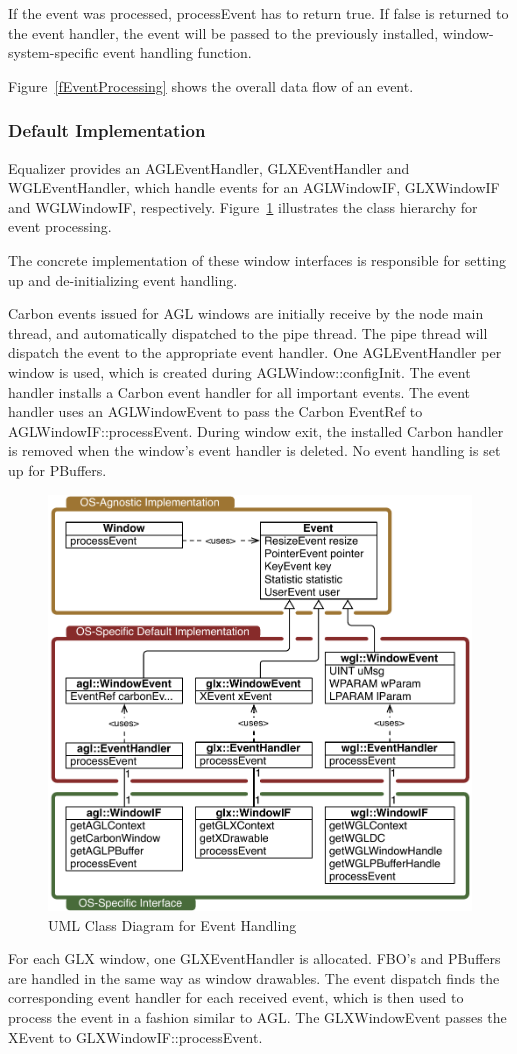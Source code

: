 \documentclass[10pt,a4]{scrartcl}
\newcommand{\fig}[1]{Figure~\ref{#1}}
\begin{document}
If the event was processed, \textsf{processEvent} has to return
\textsf{true}. If \textsf{false} is returned to the event handler, the
event will be passed to the previously installed, window-system-specific
event handling function.

\fig{fEventProcessing} shows the overall data flow of an event.

\subsubsection{Default Implementation}

Equalizer provides an \textsf{AGLEvent\-Handler},
\textsf{GLXEventHandler} and \textsf{WGL\-Event\-Handler}, which handle
events for an \textsf{AGLWindowIF}, \textsf{GLXWindowIF} and
\textsf{WGL\-Win\-dowIF}, respectively. \fig{fEventUML} illustrates the
class hierarchy for event processing.

The concrete implementation of these window interfaces is responsible
for setting up and de-initializing event handling.

Carbon events issued for AGL windows are initially receive by the node
main thread, and automatically dispatched to the pipe thread. The pipe
thread will dispatch the event to the appropriate event handler. One
\textsf{AGLEventHandler} per window is used, which is created during
\textsf{AGLWindow::configInit}. The event handler installs a Carbon
event handler for all important events. The event handler uses an
\textsf{AGLWindowEvent} to pass the Carbon \textsf{EventRef} to
\textsf{AGLWindowIF::processEvent}. During window exit, the installed
Carbon handler is removed when the window's event handler is deleted. No
event handling is set up for PBuffers.

\begin{figure}
  \includegraphics[width=.618\textwidth]{images/eventUML.pdf}
  {\caption{\label{fEventUML}UML Class Diagram for Event Handling}}
\end{figure}
For each GLX window, one \textsf{GLXEventHandler} is allocated. FBO's and
PBuffers are handled in the same way as window drawables. The event dispatch
finds the corresponding event handler for each received event, which is then
used to process the event in a fashion similar to AGL. The
\textsf{GLXWindowEvent} passes the \textsf{XEvent} to
\textsf{GLXWindowIF::\-process\-Event}.
\end{document}
